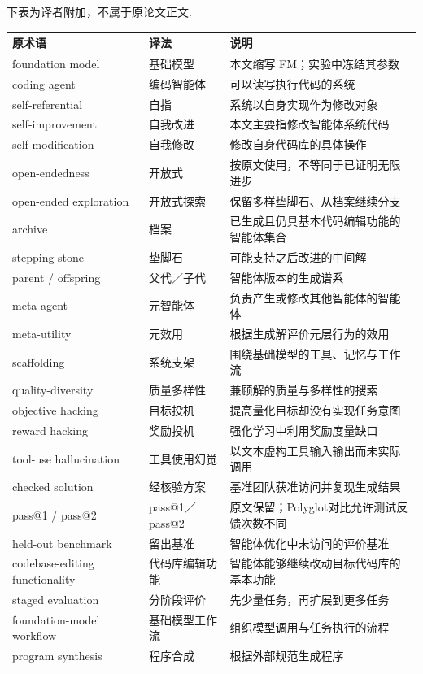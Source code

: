 \label{dgm-glossary}
下表为译者附加，不属于原论文正文.
\begin{longtable}{p{}p{}p{}}\toprule
原术语&译法&说明\\\midrule
foundation model&基础模型&本文缩写 FM；实验中冻结其参数\\
coding agent&编码智能体&可以读写执行代码的系统\\
self-referential&自指&系统以自身实现作为修改对象\\
self-improvement&自我改进&本文主要指修改智能体系统代码\\
self-modification&自我修改&修改自身代码库的具体操作\\
open-endedness&开放式&按原文使用，不等同于已证明无限进步\\
open-ended exploration&开放式探索&保留多样垫脚石、从档案继续分支\\
archive&档案&已生成且仍具基本代码编辑功能的智能体集合\\
stepping stone&垫脚石&可能支持之后改进的中间解\\
parent / offspring&父代／子代&智能体版本的生成谱系\\
meta-agent&元智能体&负责产生或修改其他智能体的智能体\\
meta-utility&元效用&根据生成解评价元层行为的效用\\
scaffolding&系统支架&围绕基础模型的工具、记忆与工作流\\
quality-diversity&质量多样性&兼顾解的质量与多样性的搜索\\
objective hacking&目标投机&提高量化目标却没有实现任务意图\\
reward hacking&奖励投机&强化学习中利用奖励度量缺口\\
tool-use hallucination&工具使用幻觉&以文本虚构工具输入输出而未实际调用\\
checked solution&经核验方案&基准团队获准访问并复现生成结果\\
pass@1 / pass@2&pass@1／pass@2&原文保留；Polyglot对比允许测试反馈次数不同\\
held-out benchmark&留出基准&智能体优化中未访问的评价基准\\
codebase-editing functionality&代码库编辑功能&智能体能够继续改动目标代码库的基本功能\\
staged evaluation&分阶段评价&先少量任务，再扩展到更多任务\\
foundation-model workflow&基础模型工作流&组织模型调用与任务执行的流程\\
program synthesis&程序合成&根据外部规范生成程序\\
\bottomrule\end{longtable}
